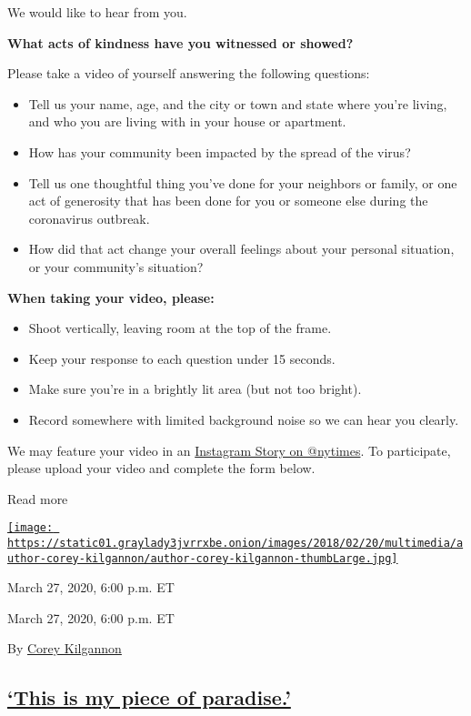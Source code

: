 We would like to hear from you.

\textbf{What acts of kindness have you witnessed or showed?}

Please take a video of yourself answering the following questions:

\begin{itemize}
\item
  Tell us your name, age, and the city or town and state where you're
  living, and who you are living with in your house or apartment.
\item
  How has your community been impacted by the spread of the virus?
\item
  Tell us one thoughtful thing you've done for your neighbors or family,
  or one act of generosity that has been done for you or someone else
  during the coronavirus outbreak.
\item
  How did that act change your overall feelings about your personal
  situation, or your community's situation?
\end{itemize}

\textbf{When taking your video, please:}

\begin{itemize}
\item
  Shoot vertically, leaving room at the top of the frame.
\item
  Keep your response to each question under 15 seconds.
\item
  Make sure you're in a brightly lit area (but not too bright).
\item
  Record somewhere with limited background noise so we can hear you
  clearly.
\end{itemize}

We may feature your video in an
\href{https://www.instagram.com/nytimes/}{Instagram Story on @nytimes}.
To participate, please upload your video and complete the form below.

Read more

\href{https://www.nytimes3xbfgragh.onion/by/corey-kilgannon}{\texttt{[image: https://static01.graylady3jvrrxbe.onion/images/2018/02/20/multimedia/author-corey-kilgannon/author-corey-kilgannon-thumbLarge.jpg]}}

March 27, 2020, 6:00 p.m. ET

March 27, 2020, 6:00 p.m. ET

By \href{https://www.nytimes3xbfgragh.onion/by/corey-kilgannon}{Corey
Kilgannon}

\hypertarget{this-is-my-piece-of-paradise}{%
\subsection{\texorpdfstring{\protect\hyperlink{this-is-my-piece-of-paradise}{`This
is my piece of
paradise.'}}{`This is my piece of paradise.'}}\label{this-is-my-piece-of-paradise}}


